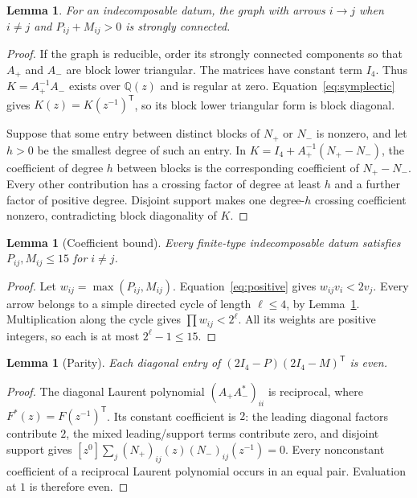 \documentclass[11pt,a4paper]{article}
\newtheorem{lemma}[theorem]{Lemma}
\theoremstyle{definition}
\newcommand{\Q}{\mathbb Q}
\begin{document}
\begin{lemma}\label{lem:strong}
For an indecomposable datum, the graph with arrows $i\to j$ when $i\ne j$ and
$P_{ij}+M_{ij}>0$ is strongly connected.
\end{lemma}
\begin{proof}
If the graph is reducible, order its strongly connected components so that
$A_+$ and $A_-$ are block lower triangular. The matrices have constant term
$I_4$. Thus $K=A_+^{-1}A_-$ exists over $\Q(z)$ and is regular at zero.
Equation~\eqref{eq:symplectic} gives $K(z)=K(z^{-1})^{\mathsf T}$, so its
block lower triangular form is block diagonal.

Suppose that some entry between distinct blocks of $N_+$ or $N_-$ is nonzero,
and let $h>0$ be the smallest degree of such an entry. In
$K=I_4+A_+^{-1}(N_+-N_-)$, the coefficient of degree $h$ between blocks is
the corresponding coefficient of $N_+-N_-$. Every other contribution has a
crossing factor of degree at least $h$ and a further factor of positive
degree. Disjoint support makes one degree-$h$ crossing coefficient nonzero,
contradicting block diagonality of $K$.
\end{proof}

\begin{lemma}[Coefficient bound]\label{lem:bound}
Every finite-type indecomposable datum satisfies $P_{ij},M_{ij}\le15$ for
$i\ne j$.
\end{lemma}
\begin{proof}
Let $w_{ij}=\max(P_{ij},M_{ij})$. Equation~\eqref{eq:positive} gives
$w_{ij}v_i<2v_j$. Every arrow belongs to a simple directed cycle of length
$\ell\le4$, by Lemma~\ref{lem:strong}. Multiplication along the cycle gives
$\prod w_{ij}<2^\ell$. All its weights are positive integers, so each is
at most $2^\ell-1\le15$.
\end{proof}

\begin{lemma}[Parity]\label{lem:parity}
Each diagonal entry of $(2I_4-P)(2I_4-M)^{\mathsf T}$ is even.
\end{lemma}
\begin{proof}
The diagonal Laurent polynomial $(A_+A_-^*)_{ii}$ is reciprocal, where
$F^*(z)=F(z^{-1})^{\mathsf T}$. Its constant coefficient is $2$: the leading
diagonal factors contribute $2$, the mixed leading/support terms contribute
zero, and disjoint support gives
$[z^0]\sum_j(N_+)_{ij}(z)(N_-)_{ij}(z^{-1})=0$.
Every nonconstant coefficient of a reciprocal Laurent polynomial occurs in
an equal pair. Evaluation at $1$ is therefore even.
\end{proof}
\end{document}

